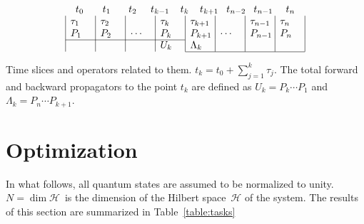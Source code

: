 \documentclass[aps, pra, a4paper, longbibliography]{revtex4}
\newcommand{\hilb}[1]{\mathcal{#1}}
\begin{document}
\begin{table}[h]
\label{table:slices}
\[
\begin{array}{c}
\begin{array}{@{t_0}p{1.9em}@{t_1}p{1.8em}@{t_2}p{1.4em}@{t_{k-1}}p{1.1em}@{t_{k}}p{1.1em}@{t_{k+1}}p{0.8em}@{t_{n-2}}p{0.8em}@{t_{n-1}}p{1.3em}@{t_n}}
& & & & & & &
\end{array}\\
\begin{array}{|p{2em}|p{2em}|p{2em}|p{2em}|p{2em}|p{2em}|p{2em}|p{2em}|}
 $\tau_1$ & $\tau_2$ & & $\tau_k$ & $\tau_{k+1}$ & & $\tau_{n-1}$ & $\tau_n$ \\
 $P_1$ & $P_2$ & $\cdots$ & $P_k$ & $P_{k+1}$ & $\cdots$ & $P_{n-1}$ & $P_n$ \\
\cline{1-4}
& & & $U_{k}$ & $\Lambda_{k}$ & & & \\
\cline{5-8}
\end{array}
\end{array}
\]
\caption{Time slices and operators related to them.
$t_k = t_0 + \sum_{j=1}^{k} \tau_j$.
The total forward and backward
propagators to the point $t_k$ are defined as
$U_k = P_k \cdots P_1$ and
$\Lambda_k = P_{n} \cdots P_{k+1}$.}
\end{table}








\section{Optimization}

In what follows, all quantum states are assumed to be normalized to
unity. $N = \dim \hilb{H}$~is the dimension of the Hilbert space~$\hilb{H}$ of the system.
The results of this section are summarized in Table~\ref{table:tasks}
\end{document}
